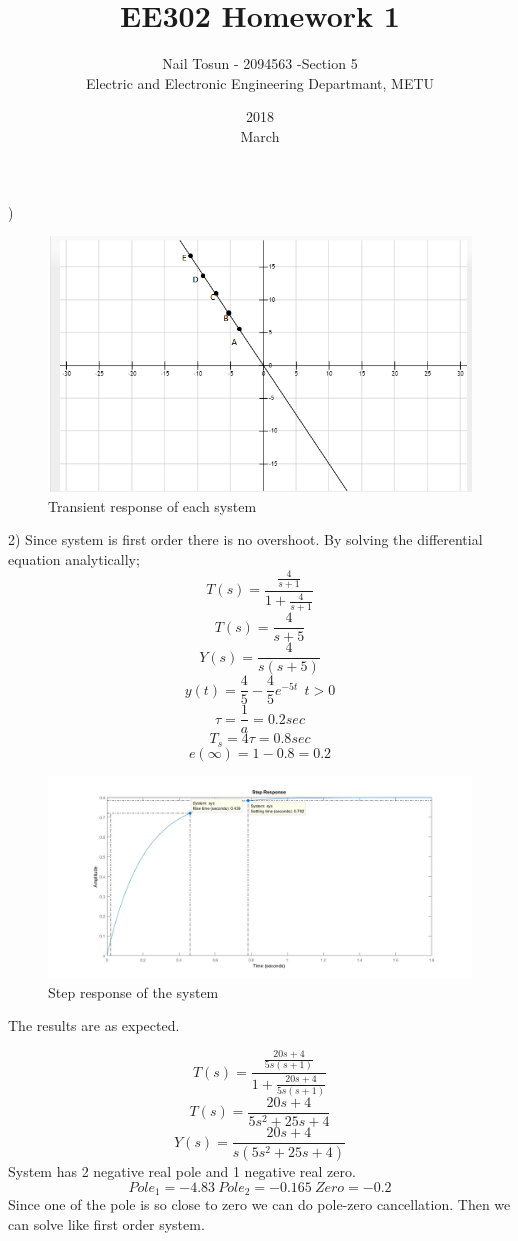\documentclass[11pt]{article}
\title{EE302 Homework 1}
\date{2018\\ March}
\author{Nail Tosun - 2094563 -Section 5\\ Electric and Electronic Engineering Departmant, METU}
\begin{document}
)
\begin{figure}[H]
  \includegraphics[scale=0.7, center]{11}
  \caption{Transient response of each system}
  \label{fig:zero}
\end{figure}

2)
	Since system is first order there is no overshoot. By solving the differential equation analytically;
	$$T(s)=\frac{\frac{4}{s+1}}{1+\frac{4}{s+1}}$$
	$$T(s)=\frac{4}{s+5}$$
	$$Y(s)=\frac{4}{s(s+5)}$$
	$$y(t) = \frac{4}{5}-\frac{4}{5}e^{-5t} \> \> t>0 $$
	$$\tau=\frac{1}{a}=0.2 sec$$ 
	$$T_s=4\tau=0.8 sec$$
	$$e(\infty)=1-0.8=0.2$$ 
	

\begin{figure}[H]
  \includegraphics[scale=0.7, center]{step1}
  \caption{Step response of the system}
  \label{fig:zero}
\end{figure}
The results are as expected.

\[T(s)=\frac{\frac{20s+4}{5s(s+1)}}{1+\frac{20s+4}{5s(s+1)}}\]
\[T(s)=\frac{20s+4}{5s^2+25s+4}\]
\[Y(s)=\frac{20s+4}{s(5s^2+25s+4)}\]
System has 2 negative real pole and 1 negative real zero.
$$Pole_1=-4.83 \> Pole_2=-0.165 \> Zero=-0.2$$
Since one of the pole is so close to zero we can do pole-zero cancellation. Then we can solve like first order system.
\end{document}

